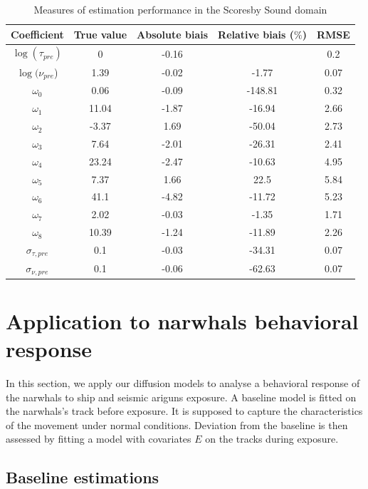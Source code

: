 \documentclass[11pt]{article}
\newcommand {\1}{\mathbb{1}}
\begin{document}
\begin{table}[H]
	\centering
	\begin{tabular}{|c|c|c|c|c|}
		\hline
		Coefficient  & True value  & Absolute biais & Relative biais ($\%$)& RMSE \\
		\hline
		$\log(\tau_{pre})$   & 0     & -0.16 &         & 0.2  \\
		$\log(\nu_{pre}$)     & 1.39  & -0.02 & -1.77     & 0.07 \\
		$\omega_0$   & 0.06  & -0.09 & -148.81   & 0.32 \\
		$\omega_1$ & 11.04 & -1.87 & -16.94    & 2.66 \\
		$\omega_2$ & -3.37 & 1.69  & -50.04    & 2.73 \\
		$\omega_3$ & 7.64  & -2.01 & -26.31    & 2.41 \\
		$\omega_4$ & 23.24 & -2.47 & -10.63    & 4.95 \\
		$\omega_5$ & 7.37  & 1.66  & 22.5      & 5.84 \\
		$\omega_6$ & 41.1  & -4.82 & -11.72    & 5.23 \\
		$\omega_7$ & 2.02  & -0.03 & -1.35     & 1.71 \\
		$\omega_8$ & 10.39 & -1.24 & -11.89    & 2.26 \\
		$\sigma_{\tau,pre}$  & 0.1   & -0.03 & -34.31    & 0.07 \\
		$\sigma_{\nu,pre}$   & 0.1   & -0.06 & -62.63    & 0.07 \\
		\hline
	\end{tabular}
	\caption{Measures of estimation performance in the Scoresby Sound domain}
		\label{table: estimation performance fjords}
\end{table}


\section{Application to narwhals behavioral response}


In this section, we apply our diffusion models to analyse a behavioral response of the narwhals to ship and seismic ariguns exposure.
A baseline model is fitted on the narwhals's track before exposure. It is supposed to capture the characteristics of the movement under normal conditions. Deviation from the baseline is then assessed by fitting a model with covariates $E$ on the tracks during exposure.


\subsection{Baseline estimations}
\end{document}
